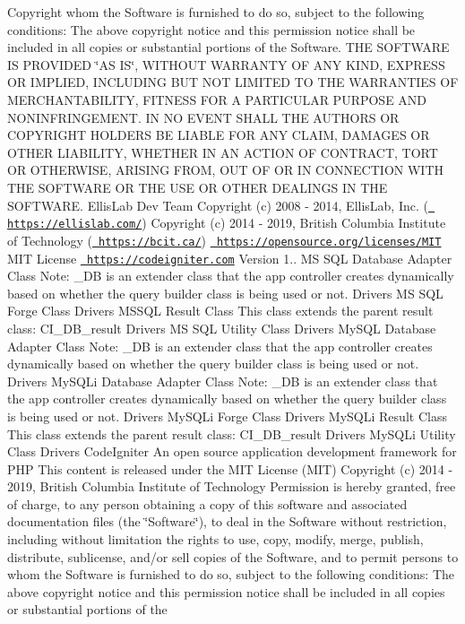 \begin{DoxyCopyright}{Copyright}
whom the Software is furnished to do so, subject to the following conditions\+: The above copyright notice and this permission notice shall be included in all copies or substantial portions of the Software. T\+HE S\+O\+F\+T\+W\+A\+RE IS P\+R\+O\+V\+I\+D\+ED \char`\"{}\+A\+S I\+S\char`\"{}, W\+I\+T\+H\+O\+UT W\+A\+R\+R\+A\+N\+TY OF A\+NY K\+I\+ND, E\+X\+P\+R\+E\+SS OR I\+M\+P\+L\+I\+ED, I\+N\+C\+L\+U\+D\+I\+NG B\+UT N\+OT L\+I\+M\+I\+T\+ED TO T\+HE W\+A\+R\+R\+A\+N\+T\+I\+ES OF M\+E\+R\+C\+H\+A\+N\+T\+A\+B\+I\+L\+I\+TY, F\+I\+T\+N\+E\+SS F\+OR A P\+A\+R\+T\+I\+C\+U\+L\+AR P\+U\+R\+P\+O\+SE A\+ND N\+O\+N\+I\+N\+F\+R\+I\+N\+G\+E\+M\+E\+NT. IN NO E\+V\+E\+NT S\+H\+A\+LL T\+HE A\+U\+T\+H\+O\+RS OR C\+O\+P\+Y\+R\+I\+G\+HT H\+O\+L\+D\+E\+RS BE L\+I\+A\+B\+LE F\+OR A\+NY C\+L\+A\+IM, D\+A\+M\+A\+G\+ES OR O\+T\+H\+ER L\+I\+A\+B\+I\+L\+I\+TY, W\+H\+E\+T\+H\+ER IN AN A\+C\+T\+I\+ON OF C\+O\+N\+T\+R\+A\+CT, T\+O\+RT OR O\+T\+H\+E\+R\+W\+I\+SE, A\+R\+I\+S\+I\+NG F\+R\+OM, O\+UT OF OR IN C\+O\+N\+N\+E\+C\+T\+I\+ON W\+I\+TH T\+HE S\+O\+F\+T\+W\+A\+RE OR T\+HE U\+SE OR O\+T\+H\+ER D\+E\+A\+L\+I\+N\+GS IN T\+HE S\+O\+F\+T\+W\+A\+RE.  Ellis\+Lab Dev Team  Copyright (c) 2008 -\/ 2014, Ellis\+Lab, Inc. (\href{https://ellislab.com/}{\texttt{ https\+://ellislab.\+com/}})  Copyright (c) 2014 -\/ 2019, British Columbia Institute of Technology (\href{https://bcit.ca/}{\texttt{ https\+://bcit.\+ca/}})  \href{https://opensource.org/licenses/MIT}{\texttt{ https\+://opensource.\+org/licenses/\+M\+IT}} M\+IT License  \href{https://codeigniter.com}{\texttt{ https\+://codeigniter.\+com}}  Version 1..  MS S\+QL Database Adapter Class Note\+: \+\_\+\+DB is an extender class that the app controller creates dynamically based on whether the query builder class is being used or not.  Drivers MS S\+QL Forge Class  Drivers M\+S\+S\+QL Result Class This class extends the parent result class\+: C\+I\+\_\+\+D\+B\+\_\+result  Drivers MS S\+QL Utility Class  Drivers My\+S\+QL Database Adapter Class Note\+: \+\_\+\+DB is an extender class that the app controller creates dynamically based on whether the query builder class is being used or not.  Drivers My\+S\+Q\+Li Database Adapter Class Note\+: \+\_\+\+DB is an extender class that the app controller creates dynamically based on whether the query builder class is being used or not.  Drivers My\+S\+Q\+Li Forge Class  Drivers My\+S\+Q\+Li Result Class This class extends the parent result class\+: C\+I\+\_\+\+D\+B\+\_\+result  Drivers My\+S\+Q\+Li Utility Class  Drivers Code\+Igniter An open source application development framework for P\+HP This content is released under the M\+IT License (M\+IT) Copyright (c) 2014 -\/ 2019, British Columbia Institute of Technology Permission is hereby granted, free of charge, to any person obtaining a copy of this software and associated documentation files (the \char`\"{}\+Software\char`\"{}), to deal in the Software without restriction, including without limitation the rights to use, copy, modify, merge, publish, distribute, sublicense, and/or sell copies of the Software, and to permit persons to whom the Software is furnished to do so, subject to the following conditions\+: The above copyright notice and this permission notice shall be included in all copies or substantial portions of the 
\end{DoxyCopyright}
